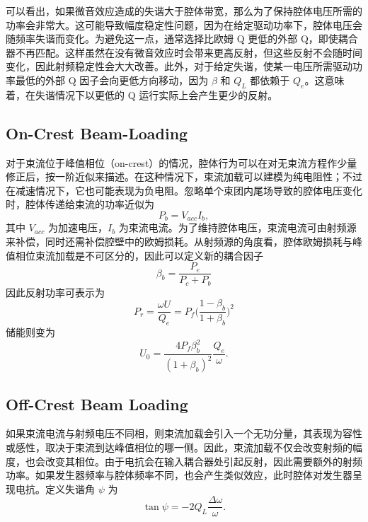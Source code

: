 \documentclass{cernyrep}
\begin{document}
可以看出，如果微音效应造成的失谐大于腔体带宽，那么为了保持腔体电压所需的功率会非常大。这可能导致幅度稳定性问题，因为在给定驱动功率下，腔体电压会随频率失谐而变化。为避免这一点，通常选择比欧姆 Q 更低的外部 Q，即使耦合器不再匹配。这样虽然在没有微音效应时会带来更高反射，但这些反射不会随时间变化，因此射频稳定性会大大改善。此外，对于给定失谐，使某一电压所需驱动功率最低的外部 Q 因子会向更低方向移动，因为 $\beta$ 和 $Q_L$ 都依赖于 $Q_e$。这意味着，在失谐情况下以更低的 Q 运行实际上会产生更少的反射。




\subsection {On-Crest Beam-Loading}
对于束流位于峰值相位（on-crest）的情况，腔体行为可以在对无束流方程作少量修正后，按一阶近似来描述。在这种情况下，束流加载可以建模为纯电阻性；不过在减速情况下，它也可能表现为负电阻。忽略单个束团内尾场导致的腔体电压变化时，腔体传递给束流的功率近似为
\begin{equation}
P_b= V_{acc} I_b,
\end{equation}
其中 $V_{acc}$ 为加速电压，$I_b$ 为束流电流。为了维持腔体电压，束流电流可由射频源来补偿，同时还需补偿腔壁中的欧姆损耗。从射频源的角度看，腔体欧姆损耗与峰值相位束流加载是不可区分的，因此可以定义新的耦合因子
\begin{equation}
\beta_b= \frac{P_e}{P_c+P_b}
\end{equation}
因此反射功率可表示为
\begin{equation}
P_r= \frac{\omega U}{Q_e} = P_f \Bigg(  \frac{1- \beta_b}{1+ \beta_b} \Bigg)^2
\end{equation}
储能则变为
\begin{equation}
U_0 = \frac{4 P_f \beta_b^2}{(1+\beta_b)^2} \frac{Q_e}{\omega}.
\end{equation}


\subsection {Off-Crest Beam Loading}
如果束流电流与射频电压不同相，则束流加载会引入一个无功分量，其表现为容性或感性，取决于束流到达峰值相位的哪一侧。因此，束流加载不仅会改变射频的幅度，也会改变其相位。由于电抗会在输入耦合器处引起反射，因此需要额外的射频功率。如果发生器频率与腔体频率不同，也会产生类似效应，此时腔体对发生器呈现电抗。定义失谐角 $\psi$ 为
\begin{equation}
\tan{\psi}=-2 Q_L \frac{\Delta \omega }{\omega}.
\end{equation}
\end{document}
